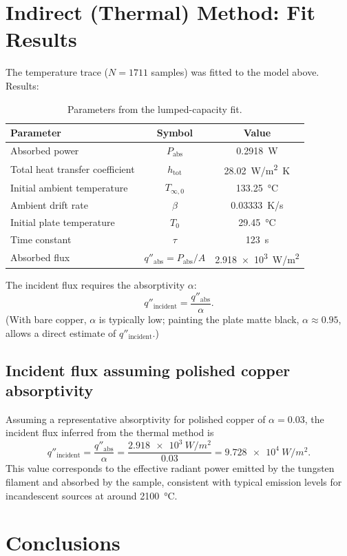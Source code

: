 \documentclass[a4paper,11pt]{article}
\begin{document}
\section{Indirect (Thermal) Method: Fit Results}
The temperature trace ($N=\num{1711}$ samples) was fitted to the model above. Results:

\begin{table}[h!]
\centering
\begin{tabular}{lcc}
\hline
Parameter & Symbol & Value \\
\hline
Absorbed power & $P_{\text{abs}}$ & \SI{0.2918}{W} \\
Total heat transfer coefficient & $h_{\text{tot}}$ & \SI{28.02}{W/m^2.K} \\
Initial ambient temperature & $T_{\infty,0}$ & \SI{133.25}{\celsius} \\
Ambient drift rate & $\beta$ & \SI{0.03333}{K/s} \\
Initial plate temperature & $T_{0}$ & \SI{29.45}{\celsius} \\
Time constant & $\tau$ & \SI{123}{s} \\
Absorbed flux & $q''_{\text{abs}}=P_{\text{abs}}/A$ & \SI{2.918e3}{W/m^2} \\
\hline
\end{tabular}
\caption{Parameters from the lumped-capacity fit.}
\end{table}

The incident flux requires the absorptivity $\alpha$:
\[
q''_{\text{incident}}=\frac{q''_{\text{abs}}}{\alpha}.
\]
(With bare copper, $\alpha$ is typically low; painting the plate matte black, $\alpha\approx0.95$, allows a direct estimate of $q''_{\text{incident}}$.)

\subsection*{Incident flux assuming polished copper absorptivity}
Assuming a representative absorptivity for polished copper of $\alpha = 0.03$, the incident flux inferred from the thermal method is
\[
q''_{\text{incident}} = \frac{q''_{\text{abs}}}{\alpha}
= \frac{\SI{2.918e3}{W/m^2}}{0.03}
= \SI{9.728e4}{W/m^2}.
\]
This value corresponds to the effective radiant power emitted by the tungsten filament and absorbed by the sample, consistent with typical emission levels for incandescent sources at around \SI{2100}{\celsius}.

\section{Conclusions}
\end{document}
